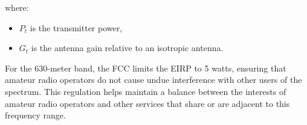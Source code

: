 where:
\begin{itemize}
    \item \( P_t \) is the transmitter power,
    \item \( G_t \) is the antenna gain relative to an isotropic antenna.
\end{itemize}

For the 630-meter band, the FCC limits the EIRP to 5 watts, ensuring that amateur radio operators do not cause undue interference with other users of the spectrum. This regulation helps maintain a balance between the interests of amateur radio operators and other services that share or are adjacent to this frequency range.


